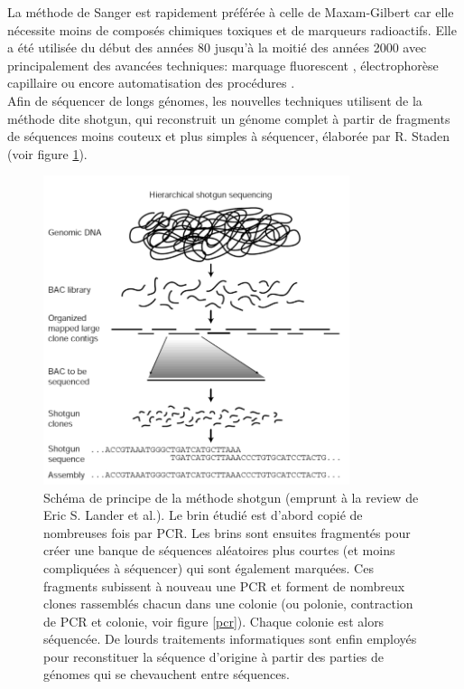 \documentclass[a4paper,11pt]{article}
\begin{document}
 
 La méthode de Sanger est rapidement préférée à celle de Maxam-Gilbert car elle nécessite moins de composés chimiques toxiques et de marqueurs radioactifs. Elle a été utilisée du début des années 80 jusqu'à la moitié des années 2000 avec principalement des avancées techniques:  marquage fluorescent \cite{Prober1987}, électrophorèse capillaire \cite{Swerdlow1991} ou encore automatisation des procédures \cite{Hunkapiller1991}.\\
 
  Afin de séquencer de longs génomes, les nouvelles techniques utilisent de la méthode dite shotgun, qui reconstruit un génome complet à partir de fragments de séquences moins couteux et plus simples à séquencer, élaborée par R. Staden \cite{Staden1979} (voir figure \ref{shotgun}).
 


\begin{figure}[H]
\begin{center}
\includegraphics[width=0.8\textwidth]{shotgun.jpeg}
\vspace{0.5cm}

\caption{Schéma de principe de la méthode shotgun (emprunt à la review de Eric S. Lander et al.\cite{Lander2001}). Le brin étudié est d'abord copié de nombreuses fois par PCR. Les brins sont ensuites fragmentés pour créer une banque de séquences aléatoires plus courtes (et moins compliquées à séquencer) qui sont également marquées. Ces fragments subissent à nouveau une PCR et forment de nombreux clones rassemblés chacun dans une colonie (ou polonie, contraction de PCR et colonie, voir figure \ref{pcr}). Chaque colonie est alors séquencée. De lourds traitements informatiques sont enfin employés pour reconstituer la séquence d'origine à partir des parties de génomes qui se chevauchent entre séquences.}
\label{shotgun}
\end{center}
\end{figure}
\end{document}
